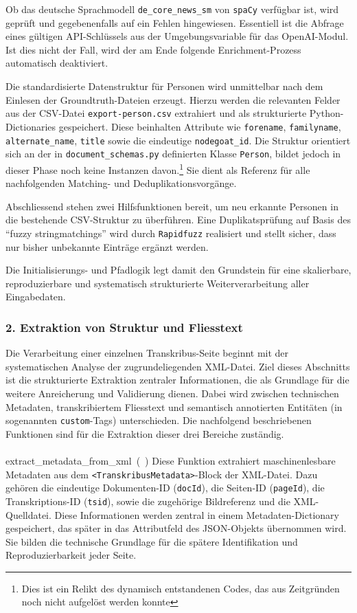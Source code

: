 \documentclass[12pt, a4paper, ngerman, bidi=default]{article}
\makeatletter
\newcommand{\code}[1]{\colorbox{VeryLightGray}{\texttt{#1}}} %
\let\oldparagraph\paragraph%
\renewcommand{\paragraph}{
    \@ifstar%
      \xxxParagraphStar%
      \xxxParagraphNoStar%
 }
\newcommand{\xxxParagraphStar}[1]{\oldparagraph*{#1}\mbox{}}
\newcommand{\xxxParagraphNoStar}[1]{\oldparagraph{#1}\mbox{}}
\makeatother
\begin{document}
Ob das deutsche Sprachmodell 
\code{de\_core\_news\_sm} von \code{spaCy} verfügbar ist, wird geprüft und gegebenenfalls auf ein Fehlen hingewiesen. 
Essentiell ist die Abfrage eines gültigen 
API-Schlüssels aus der Umgebungsvariable für das OpenAI-Modul. Ist dies nicht der Fall, wird der am Ende folgende Enrichment-Prozess automatisch deaktiviert.

Die standardisierte Datenstruktur für Personen wird unmittelbar nach dem Einlesen der 
Groundtruth-Dateien erzeugt. Hierzu werden die relevanten Felder aus der CSV-Datei 
\code{export-person.csv} extrahiert und als strukturierte Python-Dictionaries gespeichert. 
Diese beinhalten Attribute wie \code{forename}, \code{familyname}, \code{alternate\_name}, 
\code{title} sowie die eindeutige \code{nodegoat\_id}. Die Struktur orientiert sich an der in 
\code{document\_schemas.py} definierten Klasse \code{Person}, bildet jedoch in dieser Phase noch 
keine Instanzen davon.\footnote{Dies ist ein Relikt des dynamisch entstandenen Codes, das aus Zeitgründen noch nicht aufgelöst werden konnte} Sie dient als Referenz für alle nachfolgenden Matching- und 
Deduplikationsvorgänge.

Abschliessend stehen zwei Hilfsfunktionen bereit, um neu erkannte Personen in die bestehende 
CSV-Struktur zu überführen. Eine Duplikatsprüfung auf Basis des \enquote{fuzzy stringmatchings} wird 
durch \code{Rapidfuzz} realisiert und stellt sicher, dass nur bisher unbekannte Einträge ergänzt werden.

Die Initialisierungs- und Pfadlogik legt damit den Grundstein für eine skalierbare, 
reproduzierbare und systematisch strukturierte Weiterverarbeitung aller Eingabedaten.


\subsubsection*{2. Extraktion von Struktur und Fliesstext}

Die Verarbeitung einer einzelnen Transkribus-Seite beginnt mit der systematischen Analyse der zugrundeliegenden XML-Datei. 
Ziel dieses Abschnitts ist die strukturierte Extraktion zentraler Informationen, die als Grundlage für die weitere Anreicherung 
und Validierung dienen. Dabei wird zwischen technischen Metadaten, transkribiertem Fliesstext und semantisch annotierten Entitäten 
(in sogenannten \code{custom}-Tags) unterschieden. Die nachfolgend beschriebenen Funktionen sind für die Extraktion dieser drei 
Bereiche zuständig.

\paragraph{extract\_metadata\_from\_xml~(~)} Diese Funktion extrahiert maschinenlesbare Metadaten aus dem 
\code{<TranskribusMetadata>}-Block der XML-Datei. Dazu gehören die eindeutige Dokumenten-ID (\code{docId}), die Seiten-ID 
(\code{pageId}), die Transkriptions-ID (\code{tsid}), sowie die zugehörige Bildreferenz und die XML-Quelldatei. Diese Informationen 
werden zentral in einem Metadaten-Dictionary gespeichert, das später in das Attributfeld des JSON-Objekts übernommen wird. 
Sie bilden die technische Grundlage für die spätere Identifikation und Reproduzierbarkeit jeder Seite.
\end{document}
